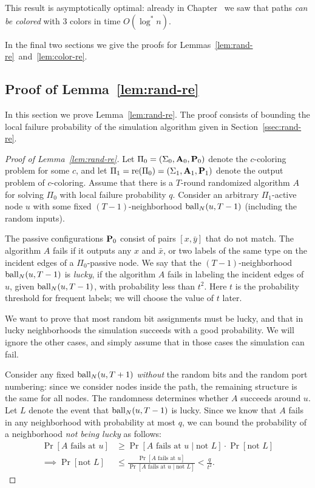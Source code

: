 This result is asymptotically optimal: already in Chapter~ we saw that paths \emph{can be colored} with 3 colors in time $O(\log^* n)$.

In the final two sections we give the proofs for Lemmas~\ref{lem:rand-re}~and~\ref{lem:color-re}.

\subsection{Proof of Lemma~\ref{lem:rand-re}} \label{ssec:rand-re-proof}

In this section we prove Lemma~\ref{lem:rand-re}. The proof consists of bounding the local failure probability of the simulation algorithm given in Section~\ref{ssec:rand-re}.

\begin{proof}[Proof of Lemma~\ref{lem:rand-re}]
Let $\Pi_0 = (\Sigma_0, \mathbf{A}_0, \mathbf{P}_0)$ denote the $c$-coloring problem for some $c$, and let $\Pi_1 = \operatorname{re}(\Pi_0) = (\Sigma_1, \mathbf{A}_1, \mathbf{P}_1)$ denote the output problem of $c$-coloring. Assume that there is a $T$-round randomized algorithm $A$ for solving $\Pi_0$ with local failure probability $q$. 
Consider an arbitrary $\Pi_1$-active node $u$ with some fixed $(T-1)$-neighborhood $\operatorname{ball}_N(u,T-1)$ (including the random inputs).

The passive configurations $\mathbf{P}_0$ consist of pairs $[x, \bar{y}]$ that do not match. The algorithm $A$ fails if it outputs any $x$ and $\bar{x}$, or two labels of the same type on the incident edges of a $\Pi_0$-passive node. We say that the $(T-1)$-neighborhood $\operatorname{ball}_N(u,T-1)$ is \emph{lucky}, if the algorithm $A$ fails in labeling the incident edges of $u$, given $\operatorname{ball}_N(u,T-1)$, with probability less than $t^2$. Here $t$ is the probability threshold for frequent labels; we will choose the value of $t$ later.

We want to prove that most random bit assignments must be lucky, and that in lucky neighborhoods the simulation succeeds with a good probability. We will ignore the other cases, and simply assume that in those cases the simulation can fail.

Consider any fixed $\operatorname{ball}_N(u,T+1)$ \emph{without} the random bits and the random port numbering: since we consider nodes inside the path, the remaining structure is the same for all nodes. The randomness determines whether $A$ succeeds around $u$. Let $L$ denote the event that $\operatorname{ball}_N(u,T-1)$ is lucky. Since we know that $A$ fails in any neighborhood with probability at most $q$, we can bound the probability of a neighborhood \emph{not being lucky} as follows:
\begin{align*}
	\Pr[A \text{ fails at } u] &\geq  
	\Pr[A \text{ fails at } u \mid \text{not } L]\cdot\Pr[\text{not } L] \\
	\implies \Pr[\text{not } L] &\leq \frac{\Pr[A \text{ fails at } u]}{\Pr[A \text{ fails at } u \mid \text{not } L]}
	< \frac{q}{t^2}.
\end{align*}


\end{proof}
